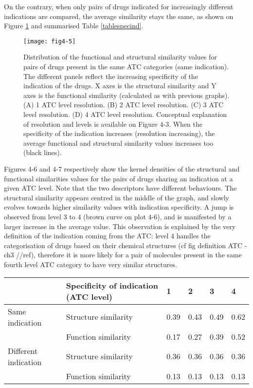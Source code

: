 On the contrary, when only pairs of drugs indicated for increasingly different indications are compared, the average similarity stays the same, as shown on Figure \ref{fig4-5} and summarised Table \ref{tablespecind}.

\begin{figure}[ht]
    \centering
    \texttt{[image: fig4-5]}
    \caption{Distribution of the functional and structural similarity values for pairs of drugs present in the same ATC categories (same indication). The different panels reflect the increasing specificity of the indication of the drugs. X axes is the structural similarity and Y axes is the functional similarity (calculated as with previous graphs). (A) 1 ATC level resolution. (B) 2 ATC level resolution. (C) 3 ATC level resolution. (D) 4 ATC level resolution. Conceptual explanation of resolution and levels is available on Figure 4-3. When the specificity of the indication increases (resolution increasing), the average functional and structural similarity values increases too (black lines).}
    \label{fig4-5}
\end{figure}

Figures 4-6 and 4-7 respectively show the kernel densities of the structural and functional similarities values for the pairs of drugs sharing an indication at a given ATC level. Note that the two descriptors have different behaviours. The structural similarity appears centred in the middle of the graph, and slowly evolves towards higher similarity values with indication specificity. A jump is observed from level 3 to 4 (brown curve on plot 4-6), and is manifested by a larger increase in the average value. This observation is explained by the very definition of the indication coming from the ATC: level 4 handles the categorisation of drugs based on their chemical structures (cf fig definition ATC - ch3 //ref), therefore it is more likely for a pair of molecules present in the same fourth level ATC category to have very similar structures.

\begin{center}
\small
    \begin{tabular}{| l | l | l | l | l | l |}
    \hline
 & Specificity of indication (ATC level) & 1 & 2 & 3 & 4 \\ \hline \hline
Same indication & Structure similarity & 0.39 & 0.43 & 0.49 & 0.62 \\ 
 & Function similarity & 0.17 & 0.27 & 0.39 & 0.52 \\ \hline
Different indication & Structure similarity & 0.36 & 0.36 & 0.36 & 0.36 \\
 & Function similarity & 0.13 & 0.13 & 0.13 & 0.13 \\ \hline
    \end{tabular} 
    \label{tablespecind}
\end{center}

